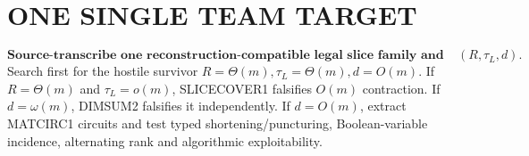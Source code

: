\documentclass[11pt]{article}
\begin{document}
\section*{ONE SINGLE TEAM TARGET}
\[
\boxed{\textbf{Source-transcribe one reconstruction-compatible legal slice family and decide }(R,\tau_L,d).}
\]
Search first for the hostile survivor \(R=\Theta(m),\tau_L=\Theta(m),d=O(m)\). If \(R=\Theta(m)\) and \(\tau_L=o(m)\), SLICECOVER1 falsifies \(O(m)\) contraction. If \(d=\omega(m)\), DIMSUM2 falsifies it independently. If \(d=O(m)\), extract MATCIRC1 circuits and test typed shortening/puncturing, Boolean-variable incidence, alternating rank and algorithmic exploitability.
\end{document}
